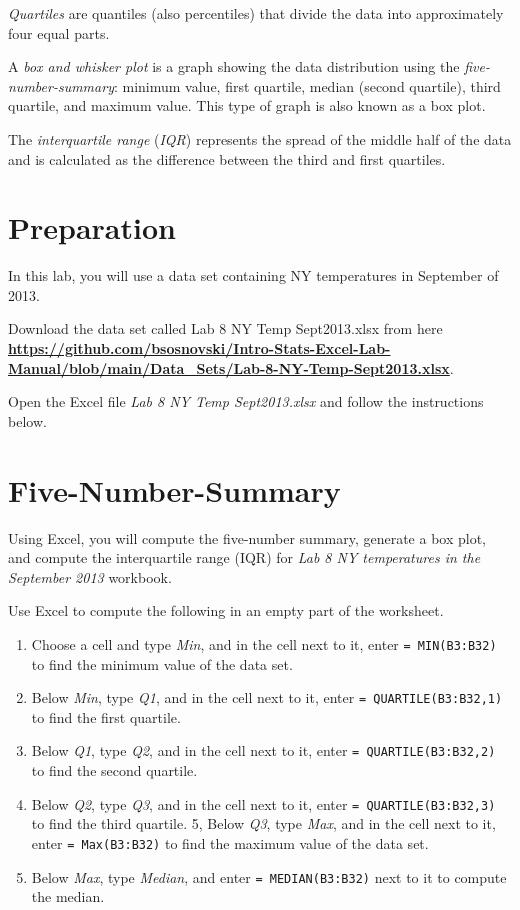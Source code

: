 \documentclass[
]{book}
\providecommand{\tightlist}{%
  \setlength{\itemsep}{0pt}\setlength{\parskip}{0pt}}
\begin{document}
\emph{Quartiles} are quantiles (also percentiles) that divide the data into approximately four equal parts.

A \emph{box and whisker plot} is a graph showing the data distribution using the \emph{five-number-summary}: minimum value, first quartile, median (second quartile), third quartile, and maximum value. This type of graph is also known as a box plot.

The \emph{interquartile range} (\emph{IQR}) represents the spread of the middle half of the data and is calculated as the difference between the third and first quartiles.

\hypertarget{preparation-5}{%
\section{Preparation}\label{preparation-5}}

In this lab, you will use a data set containing NY temperatures in September of 2013.

Download the data set called Lab 8 NY Temp Sept2013.xlsx from here \href{https://github.com/bsosnovski/Intro-Stats-Excel-Lab-Manual/blob/main/Data_Sets/Lab-8-NY-Temp-Sept2013.xlsx}{\textbf{https://github.com/bsosnovski/Intro-Stats-Excel-Lab-Manual/blob/main/Data\_Sets/Lab-8-NY-Temp-Sept2013.xlsx}}.

Open the Excel file \emph{Lab 8 NY Temp Sept2013.xlsx} and follow the instructions below.

\hypertarget{five-number-summary}{%
\section{Five-Number-Summary}\label{five-number-summary}}

Using Excel, you will compute the five-number summary, generate a box plot, and compute the interquartile range (IQR) for \emph{Lab 8 NY temperatures in the September 2013} workbook.

Use Excel to compute the following in an empty part of the worksheet.

\begin{enumerate}
\def\labelenumi{\arabic{enumi}.}
\tightlist
\item
  Choose a cell and type \emph{Min}, and in the cell next to it, enter \texttt{=\ MIN(B3:B32)} to find the minimum value of the data set.
\item
  Below \emph{Min}, type \emph{Q1}, and in the cell next to it, enter \texttt{=\ QUARTILE(B3:B32,1)} to find the first quartile.
\item
  Below \emph{Q1}, type \emph{Q2}, and in the cell next to it, enter \texttt{=\ QUARTILE(B3:B32,2)} to find the second quartile.
\item
  Below \emph{Q2}, type \emph{Q3}, and in the cell next to it, enter \texttt{=\ QUARTILE(B3:B32,3)} to find the third quartile.
  5, Below \emph{Q3}, type \emph{Max}, and in the cell next to it, enter \texttt{=\ Max(B3:B32)} to find the maximum value of the data set.
\item
  Below \emph{Max}, type \emph{Median}, and enter \texttt{=\ MEDIAN(B3:B32)} next to it to compute the median.
\end{enumerate}
\end{document}
